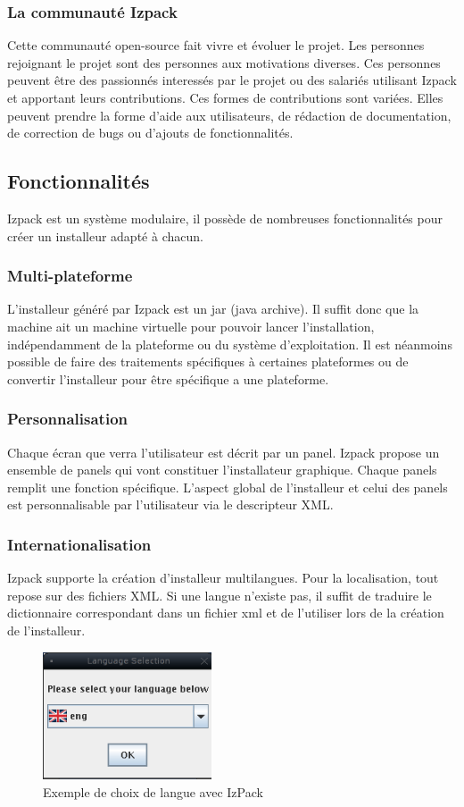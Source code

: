 \subsubsection{La communauté Izpack}
Cette communauté open-source fait vivre et évoluer le projet. Les personnes rejoignant le projet sont des personnes aux motivations diverses.
Ces personnes peuvent être des passionnés interessés par le projet ou des salariés utilisant Izpack et apportant leurs contributions.
Ces formes de contributions sont variées.
Elles peuvent prendre la forme d'aide aux utilisateurs, de rédaction de documentation, de correction de bugs ou d'ajouts de fonctionnalités.
\subsection{Fonctionnalités}
Izpack est un système modulaire, il possède de nombreuses fonctionnalités pour créer un installeur adapté à chacun.
\subsubsection{Multi-plateforme}
L'installeur généré par Izpack est un jar (java archive).
Il suffit donc que la machine ait un machine virtuelle pour pouvoir lancer l'installation, indépendamment de la plateforme ou du système d'exploitation.
Il est néanmoins possible de faire des traitements spécifiques à certaines plateformes ou de convertir l'installeur pour être spécifique a une plateforme.
\subsubsection{Personnalisation}
Chaque écran que verra l'utilisateur est décrit par un panel.
Izpack propose un ensemble de panels qui vont constituer l'installateur graphique.
Chaque panels remplit une fonction spécifique. L'aspect global de l'installeur et celui des panels est personnalisable par l'utilisateur via le descripteur XML.
\subsubsection{Internationalisation}
Izpack supporte la création d'installeur multilangues. Pour la localisation, tout repose sur des fichiers XML.
Si une langue n'existe pas, il suffit de traduire le dictionnaire correspondant dans un fichier xml et de l'utiliser lors de la création de l'installeur.
\begin{figure}[H]
	\centering
	\includegraphics[width=5cm]{../image/LangChoice.png}
	\caption{Exemple de choix de langue avec IzPack}
\end{figure}
